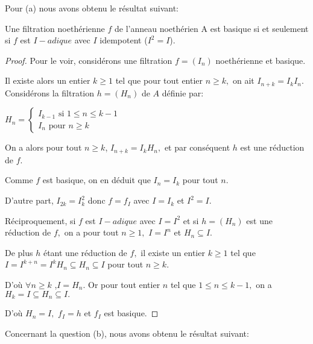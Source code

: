 Pour (a) nous avons obtenu le résultat suivant:
\begin{maproposition}
	Une filtration noethérienne $f $ de l'anneau noethérien A est basique si et seulement si $f$ est $I-adique$ avec $I$ idempotent ($I^{2}=I$).
\end{maproposition}
\begin{proof}
	Pour le voir, considérons une filtration $f=(I_{n})$ noethérienne et basique. 
	
	Il existe alors un entier $k\geq 1$ tel que pour tout entier $n\geq k,$ on
	ait $I_{n+k}=I_{k}I_{n}.$ Considérons la filtration $h=(H_{n})$ de $A$ définie par:
	
	$H_{n}=\left\{ 
	\begin{array}{c}
		I_{k-1}\text{ si }1\leq n\leq k-1 \\ 
		I_{n}\text{ pour }n\geq k%
	\end{array}%
	\right. $ 
	
	On a alors pour tout $n\geq k$, $I_{n+k}=I_{k}H_{n},$ et par conséquent $h$ est une réduction de $f.$
	
	Comme $f$ est basique, on en déduit que $I_{n}=I_{k}$ pour tout $n.$
	
	D'autre part, $I_{2k}=I_{k}^{2}$ donc $f=f_{I}$ avec $I=I_{k}$ et $I^{2}=I.$
	
	Réciproquement, si $f$ est $I-adique$ avec $I=I^{2}$ et si $h=(H_{n})$ est une réduction de $f,$ on a pour tout $n\geq 1,$ $I=I^{n}$ et $%
	H_{n}\subseteq I.$
	
	De plus $h$ étant une réduction de $f,$ il existe un entier $k\geq 1$
	tel que $I=I^{k+n}=I^{k}H_{n}\subseteq H_{n}\subseteq I$ pour tout $n\geq k.$
	
	D'où $\forall n\geq k$ ,$I=H_{n}.$ Or pour tout entier $n$ tel que $1\leq n\leq k-1,$ on a $H_{k}=I\subseteq H_{n}\subseteq I.$
	
	D'où $H_{n}=I,$ $f_{I}=h$ et $f_{I}$ est basique.
\end{proof}

Concernant la question (b), nous avons obtenu le résultat suivant:


